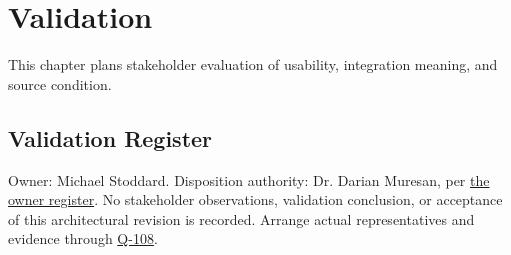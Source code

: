 \chapter{Validation}
\label{Section:ValidationResponsibility}
This chapter plans stakeholder evaluation of usability, integration meaning, and source condition.


\section{Validation Register}
Owner: Michael Stoddard. Disposition authority: Dr. Darian Muresan, per \hyperref[Table:ProjectOwners]{the owner register}. No stakeholder observations, validation conclusion, or acceptance of this architectural revision is recorded. Arrange actual representatives and evidence through \hyperref[Question:Q-108]{Q-108}.

